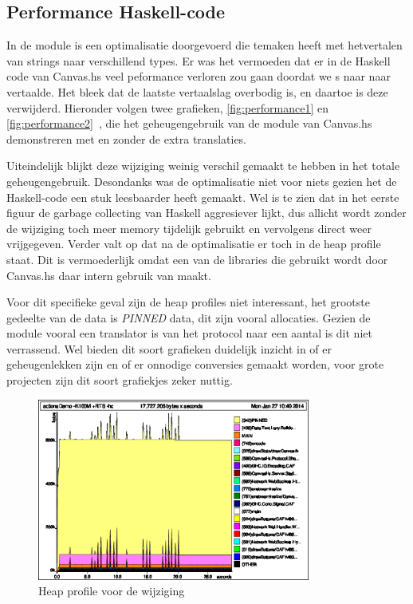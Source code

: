 \subsection{Performance Haskell-code}

In de module is een optimalisatie doorgevoerd die temaken heeft met hetvertalen van strings naar verschillend types. Er was het vermoeden dat er in de Haskell code van Canvas.hs veel peformance verloren zou gaan doordat we s naar  naar  vertaalde. Het bleek dat de laatste vertaalslag overbodig is, en daartoe is deze verwijderd. Hieronder volgen twee grafieken, \autoref{fig:performance1} en \autoref{fig:performance2}~, die het geheugengebruik van de module van Canvas.hs demonstreren met en zonder de extra translaties.

Uiteindelijk blijkt deze wijziging weinig verschil gemaakt te hebben in het totale geheugengebruik. Desondanks was de optimalisatie niet voor niets gezien het de Haskell-code een stuk leesbaarder heeft gemaakt. Wel is te zien dat in het eerste figuur de garbage collecting van Haskell aggresiever lijkt, dus allicht wordt zonder de wijziging toch meer memory tijdelijk gebruikt en vervolgens direct weer vrijgegeven. Verder valt op dat na de optimalisatie er toch  in de heap profile staat. Dit is vermoederlijk omdat een van de libraries die gebruikt wordt door Canvas.hs daar intern gebruik van maakt.

Voor dit specifieke geval zijn de heap profiles niet interessant, het grootste gedeelte van de data is \emph{PINNED} data, dit zijn vooral  allocaties. Gezien de module vooral een translator is van het protocol naar een aantal  is dit niet verrassend. Wel bieden dit soort grafieken duidelijk inzicht in of er geheugenlekken zijn en of er onnodige conversies gemaakt worden, voor grote projecten zijn dit soort grafiekjes zeker nuttig.

\begin{figure}[H]
\begin{center}
\includegraphics[keepaspectratio,width=0.8\textwidth]{./images/actionsDemoBeforeByteStrings.eps}
\caption{Heap profile voor de wijziging}
\label{fig:performance1}
\end{center}
\end{figure}

